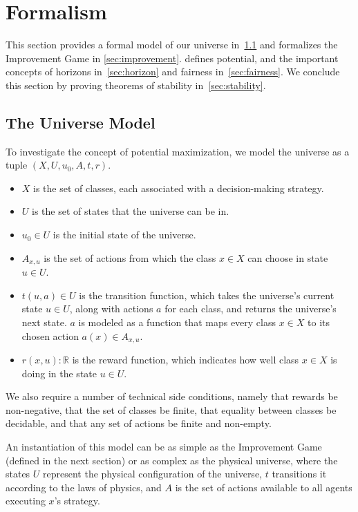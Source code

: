 \section{Formalism}
\label{sec:formalism}

This section provides a formal model of our universe in~\cref{sec:universe} and
formalizes the Improvement Game in \cref{sec:improvement}. 
defines potential, and the important concepts of horizons in~\cref{sec:horizon}
and fairness in~\cref{sec:fairness}. We conclude this section by proving
theorems of stability in~\cref{sec:stability}.

\subsection{The Universe Model}
\label{sec:universe}

To investigate the concept of potential
maximization, we model the universe as a tuple $(X, U, u_0, A, t, r)$.
\begin{itemize}
  \item $X$ is the set of classes, each associated with a decision-making
        strategy.
  \item $U$ is the set of states that the universe can be in.
  \item $u_0 \in U$ is the initial state of the universe.
  \item $A_{x, u}$ is the set of actions from which the class $x \in X$ can
        choose in state $u \in U$.
  \item $t(u, a) \in U$ is the transition function, which takes the universe's
        current state $u \in U$, along with actions $a$ for each class, and
        returns the universe's next state. $a$ is modeled as a function that
        maps every class $x \in X$ to its chosen action $a(x) \in A_{x,u}$.
  \item $r(x, u) : \mathbb{R}$ is the reward function, which indicates how well
        class $x \in X$ is doing in the state $u \in U$.
\end{itemize}

We also require a number of technical side conditions, namely that rewards be
non-negative, that the set of classes be finite, that equality between classes
be decidable, and that any set of actions be finite and non-empty.

An instantiation of this model can be as simple as the Improvement Game
(defined in the next section) or as complex as the physical universe, where the
states $U$ represent the physical configuration of the universe, $t$ transitions
it according to the laws of physics, and $A$ is the set of actions available to
all agents executing $x$'s strategy.

